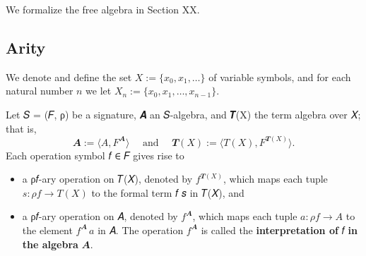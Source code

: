 \documentclass[sigplan,screen]{acmart}
\begin{document}
We formalize the free algebra in Section XX. %

\subsection{Arity}\label{arity}
We denote and define the set \(X := \{x_0,x_1,\dots \}\) of variable symbols, and for each natural number \(n\) we let \(X_n:=\{x_0,x_1,\dots, x_{n-1}\}\).

Let 𝑆 = (𝐹, ρ) be a signature, 𝑨 an 𝑆-algebra, and 𝑻(X) the term algebra over 𝑋; that is,
\[𝑨 := ⟨A, F^{𝑨}⟩ \quad \text{ and } \quad 𝑻(X) := ⟨T(X), F^{𝑻(X)}⟩.\]
Each operation symbol 𝑓 ∈ 𝐹 gives rise to
\begin{itemize}
\item a ρ𝑓-ary operation on 𝑇(𝑋), denoted by \(f^{𝑻(X)}\), which maps each tuple \(𝑠 : ρ𝑓 → 𝑇(𝑋)\) to the formal term 𝑓 𝑠 in 𝑇(𝑋), and
\item a ρ𝑓-ary operation on 𝐴, denoted by \(f^{𝑨}\), which maps each tuple \(𝑎 : ρ𝑓 → 𝐴\) to the element \(f^{𝑨} \,a\) in 𝐴. The operation \(f^{𝑨}\) is called the \textbf{interpretation of} 𝑓 \textbf{in the algebra} \(𝑨\).
\end{itemize}
\end{document}
